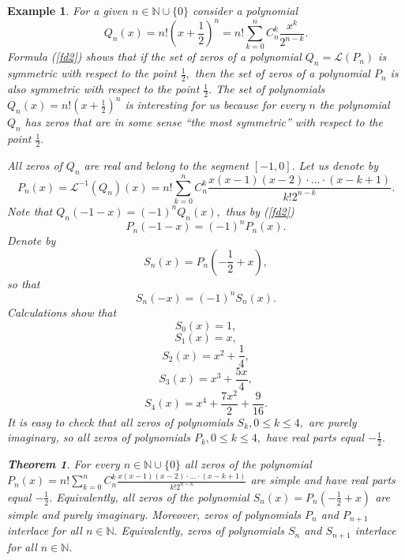 \documentclass[12pt]{amsart}
\newcounter{count}
\numberwithin{count}{section}
\newtheorem{Example}[count]{Example}
\newtheorem{theorem}[count]{Theorem}
\begin{document}
\begin{Example}
\label{ex4}
For a given $n \in \mathbb{N}\cup\{0\}$ consider a polynomial 
\begin{equation}
\label{f68}
Q_n(x)= n! \left(x+ \frac{1}{2}\right)^n = n! \sum_{k=0}^n C_n^k \frac{x^k}{2^{n-k}}.
\end{equation}
Formula (\ref{fd2}) shows that if the set of zeros of a polynomial $Q_n = \mathcal{L}(P_n)$ is symmetric 
with  respect to the point $\frac{1}{2},$ then  the set of zeros of a polynomial $P_n$ is also symmetric with
respect to the point $\frac{1}{2}.$ The set of polynomials  $Q_n(x)= n! \left(x+ \frac{1}{2}\right)^n$ is interesting 
for us because for every $n$ the polynomial $Q_n$ has zeros that are in some sense ``the most symmetric'' with  
respect to  the point $\frac{1}{2}.$


All zeros of $Q_n$ are real and belong to the segment $[-1, 0].$
Let us denote by
\begin{equation}
\label{f69}
P_n(x) = \mathcal{L}^{-1} \left(Q_n\right)(x) = n! \sum_{k=0}^n C_n^k \frac{x(x-1)(x-2)
\cdot \ldots \cdot (x-k+1)}{k! 2^{n-k}}.
\end{equation}
Note that $Q_n(-1-x) = (-1)^n Q_n(x),$ thus by (\ref{fd2})
\begin{equation}
\label{f70}
P_n(-1-x) = (-1)^n P_n(x).
\end{equation}
Denote by
\begin{equation}
\label{f71}
S_n(x) = P_n\left(- \frac{1}{2} +x\right),
\end{equation}
so that
\begin{equation}
\label{f72}
S_n(- x) =  (-1)^n S_n(x).
\end{equation}
Calculations show that
$$S_0(x)=1,$$
$$S_1(x) =x,$$
$$S_2(x)= x^2 +\frac{1}{4},$$
$$S_3(x)= x^3  + \frac{5x}{4},$$
$$S_4(x)= x^4 + \frac{7 x^2}{2} + \frac{9}{16}.$$
It is easy to check that all zeros of polynomials $S_k, 0\leq k \leq 4,$
are purely imaginary, so all zeros of polynomials $P_k, 0\leq k \leq 4,$
have real parts equal $- \frac{1}{2}.$

\begin{theorem}
\label{th1.0} For every $n\in \mathbb{N}\cup\{0\}$ all zeros of the polynomial
$P_n(x) = n! \sum_{k=0}^n C_n^k \frac{x(x-1)(x-2)
\cdot \ldots \cdot (x-k+1)}{k! 2^{n-k}}$ are simple and have real parts equal 
$- \frac{1}{2}.$ Equivalently, all zeros of the polynomial
$S_n(x) = P_n\left(- \frac{1}{2} +x\right)$ are simple and purely imaginary.
Moreover, zeros of polynomials $P_n$ and $P_{n+1}$ interlace for all
$n\in \mathbb{N}.$ Equivalently,  zeros of polynomials $S_n$ and 
$S_{n+1}$ interlace for all  $n\in \mathbb{N}.$
\end{theorem}


\end{Example}
\end{document}
